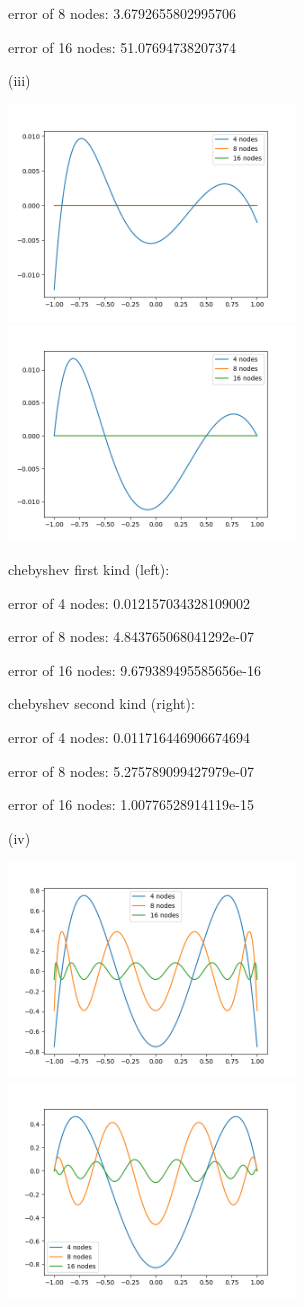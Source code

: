 \documentclass[10pt]{article}
\begin{document}
error of 8 nodes: 3.6792655802995706

error of 16 nodes: 51.07694738207374

(iii)

\includegraphics[width=3in]{p2ciii1.png}
\includegraphics[width=3in]{p2ciii2.png}

chebyshev first kind (left): 

error of 4 nodes: 0.012157034328109002

error of 8 nodes: 4.843765068041292e-07

error of 16 nodes: 9.679389495585656e-16

chebyshev second kind (right): 

error of 4 nodes: 0.011716446906674694

error of 8 nodes: 5.275789099427979e-07

error of 16 nodes: 1.00776528914119e-15


(iv)

\includegraphics[width=3in]{p2civ1.png}
\includegraphics[width=3in]{p2civ2.png}
\end{document}
